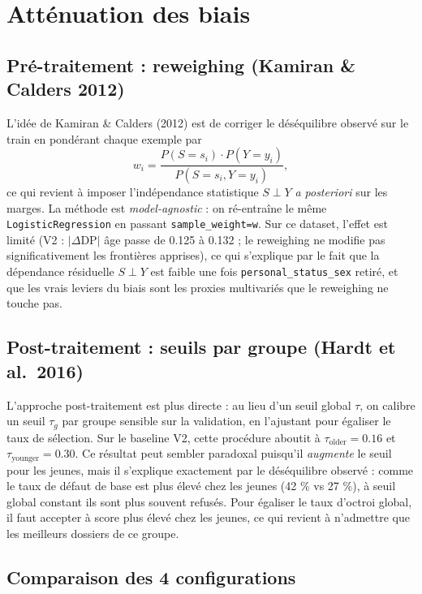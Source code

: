 \documentclass[11pt, a4paper]{article}
\begin{document}
\section{Atténuation des biais}

\subsection{Pré-traitement : reweighing (Kamiran \& Calders 2012)}

L'idée de Kamiran \& Calders (2012) est de corriger le déséquilibre observé sur le train en pondérant chaque exemple par
$$w_i = \frac{P(S = s_i) \cdot P(Y = y_i)}{P(S = s_i, Y = y_i)},$$
ce qui revient à imposer l'indépendance statistique $S \perp Y$ \emph{a posteriori} sur les marges. La méthode est \emph{model-agnostic} : on ré-entraîne le même \texttt{LogisticRegression} en passant \texttt{sample\_weight=w}. Sur ce dataset, l'effet est limité (V2 : $|\Delta\text{DP}|$ âge passe de 0.125 à 0.132 ; le reweighing ne modifie pas significativement les frontières apprises), ce qui s'explique par le fait que la dépendance résiduelle $S \perp Y$ est faible une fois \texttt{personal\_status\_sex} retiré, et que les vrais leviers du biais sont les proxies multivariés que le reweighing ne touche pas.

\subsection{Post-traitement : seuils par groupe (Hardt et al.\ 2016)}

L'approche post-traitement est plus directe : au lieu d'un seuil global $\tau$, on calibre un seuil $\tau_g$ par groupe sensible sur la validation, en l'ajustant pour égaliser le taux de sélection. Sur le baseline V2, cette procédure aboutit à $\tau_{\text{older}} = 0.16$ et $\tau_{\text{younger}} = 0.30$. Ce résultat peut sembler paradoxal puisqu'il \emph{augmente} le seuil pour les jeunes, mais il s'explique exactement par le déséquilibre observé : comme le taux de défaut de base est plus élevé chez les jeunes (42 \% vs 27 \%), à seuil global constant ils sont plus souvent refusés. Pour égaliser le taux d'octroi global, il faut accepter à score plus élevé chez les jeunes, ce qui revient à n'admettre que les meilleurs dossiers de ce groupe.

\subsection{Comparaison des 4 configurations}
\end{document}
